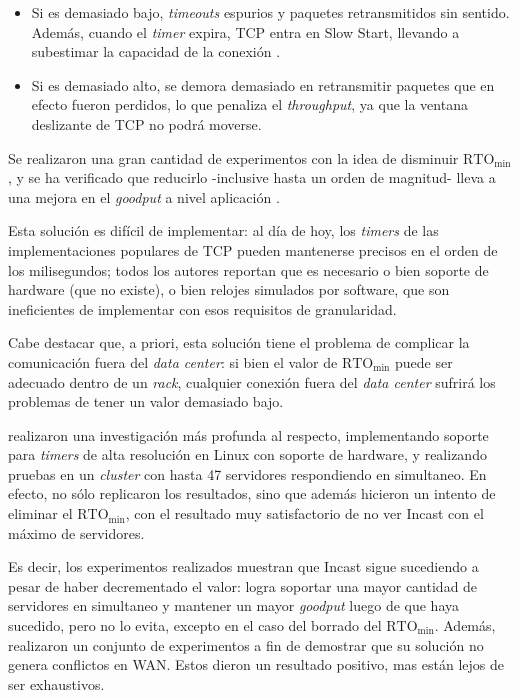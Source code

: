 \documentclass[runningheads,a4paper]{llncs}
\begin{document}
\begin{itemize}
    \item Si es demasiado bajo, \textit{timeouts} espurios y paquetes retransmitidos sin sentido. Además, cuando el \textit{timer} expira, TCP entra en Slow Start, llevando a subestimar la capacidad de la conexión \cite{Sargent_Computing_2011}.
    
    \item Si es demasiado alto, se demora demasiado en retransmitir paquetes que en efecto fueron perdidos, lo que penaliza el \textit{throughput}, ya que la ventana deslizante de TCP no podrá moverse. 
\end{itemize}

Se realizaron una gran cantidad de experimentos con la idea de disminuir $\text{RTO}_{\text{min}}$, y se ha verificado que reducirlo -inclusive hasta un orden de magnitud- lleva a una mejora en el \textit{goodput} a nivel aplicación \cite{Phanishayee_Throughput_2008} \cite{Chen_Understanding_2009} \cite{Vasudevan_FineGradinedRetrans_2009} \cite{Ke_SchedulingDataRequests_2012} \cite{Chen_Comprehensive_2015} \cite{Osada_RTO_2017}.

Esta solución es difícil de implementar: al día de hoy, los \textit{timers} de las implementaciones populares de TCP pueden mantenerse precisos en el orden de los milisegundos; todos los autores reportan que es necesario o bien soporte de hardware (que no existe), o bien relojes simulados por software, que son ineficientes de implementar con esos requisitos de granularidad.

Cabe destacar que, a priori, esta solución tiene el problema de complicar la comunicación fuera del \textit{data center}: si bien el valor de $\text{RTO}_{\text{min}}$ puede ser adecuado dentro de un \textit{rack}, cualquier conexión fuera del \textit{data center} sufrirá los problemas de tener un valor demasiado bajo.

\citet{Vasudevan_FineGradinedRetrans_2009} realizaron una investigación más profunda al respecto, implementando soporte para \textit{timers} de alta resolución en Linux con soporte de hardware, y realizando pruebas en un \textit{cluster} con hasta 47 servidores respondiendo en simultaneo. En efecto, no sólo replicaron los resultados, sino que además hicieron un intento de eliminar el $\text{RTO}_{\text{min}}$, con el resultado muy satisfactorio de no ver Incast con el máximo de servidores.

Es decir, los experimentos realizados muestran que Incast sigue sucediendo a pesar de haber decrementado el valor: logra soportar una mayor cantidad de servidores en simultaneo y mantener un mayor \textit{goodput} luego de que haya sucedido, pero no lo evita, excepto en el caso del borrado del $\text{RTO}_{\text{min}}$. Además, realizaron un conjunto de experimentos a fin de demostrar que su solución no genera conflictos en WAN. Estos dieron un resultado positivo, mas están lejos de ser exhaustivos.
\end{document}
